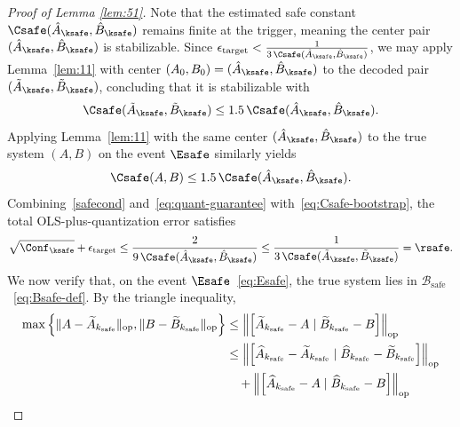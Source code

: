 \documentclass[11pt,journal,onecolumn]{IEEEtran}
\newcommand{\safe}{\mathrm{safe}}
\begin{document}
\begin{proof}[Proof of Lemma \ref{lem:51}]
    Note that the estimated safe constant $\Csafe(\hat A_{\ksafe},\hat B_{\ksafe})$ remains finite at the trigger, meaning the center pair $(\hat A_{\ksafe}, \hat B_{\ksafe})$ is stabilizable. Since $\epsilon_{\mathrm{target}} < \frac{1}{3\,\Csafe(\hat A_{\ksafe},\hat B_{\ksafe})}$, we may apply Lemma~\ref{lem:11} with center $(A_0, B_0) = (\hat A_{\ksafe}, \hat B_{\ksafe})$ to the decoded pair $(\tilde A_{\ksafe}, \tilde B_{\ksafe})$, concluding that it is stabilizable with
    \begin{equation}\label{eq:Csafe-bootstrap}
        \Csafe(\tilde A_{\ksafe}, \tilde B_{\ksafe}) \le 1.5\,\Csafe(\hat A_{\ksafe},\hat B_{\ksafe}).
    \end{equation}
    Applying Lemma~\ref{lem:11} with the same center $(\hat A_{\ksafe}, \hat B_{\ksafe})$ to the true system $(A,B)$ on the event $\Esafe$ similarly yields
    \begin{equation}\label{eq:Csafe-true}
        \Csafe(A,B) \le 1.5\,\Csafe(\hat A_{\ksafe},\hat B_{\ksafe}).
    \end{equation}
    Combining~\eqref{safecond} and~\eqref{eq:quant-guarantee} with~\eqref{eq:Csafe-bootstrap}, the total OLS-plus-quantization error satisfies
    \begin{equation}\label{eq:rsafe-bound}
        \sqrt{\Conf_{\ksafe}} + \epsilon_{\mathrm{target}} \le \frac{2}{9\,\Csafe(\hat A_{\ksafe},\hat B_{\ksafe})} \le \frac{1}{3\,\Csafe(\tilde A_{\ksafe}, \tilde B_{\ksafe})} = \rsafe.
    \end{equation}
    We now verify that, on the event $\Esafe$~\eqref{eq:Esafe}, the true system lies in $\mathcal{B}_{\safe}$~\eqref{eq:Bsafe-def}. By the triangle inequality,
    \begin{subequations}
        \label{eq:safety_derivation}
        \begin{align}
            \max \left\{ \| A - \widetilde{A}_{k_{\text{safe}}} \|_{\mathrm{op}} , \| B - \widetilde{B}_{k_{\text{safe}}} \|_{\mathrm{op}} \right\}
             & \leq \left\| \left[ \widetilde{A}_{k_{\text{safe}}} - A \mid \widetilde{B}_{k_{\text{safe}}} - B \right] \right\|_{\mathrm{op}} \label{eq:block_norm}                              \\
             & \leq \left\| \left[ \widehat{A}_{k_{\text{safe}}} - \widetilde{A}_{k_{\text{safe}}} \mid \widehat{B}_{k_{\text{safe}}} - \widetilde{B}_{k_{\text{safe}}} \right] \right\|_{\mathrm{op}} \notag \\
             & \quad + \left\| \left[ \widehat{A}_{k_{\text{safe}}} - A \mid \widehat{B}_{k_{\text{safe}}} - B \right] \right\|_{\mathrm{op}} \label{eq:triangle_ineq}                            \\

\end{align}
\end{subequations}
\end{proof}
\end{document}

